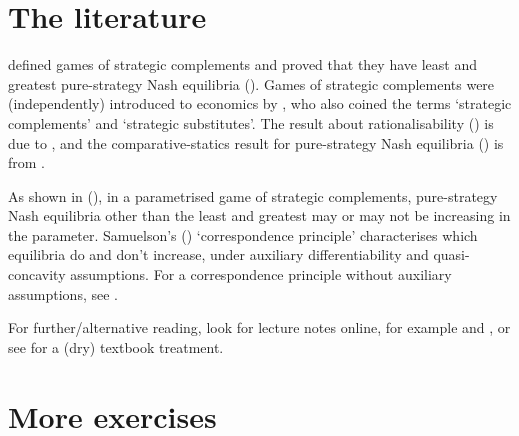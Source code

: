 \section{The literature}
\label{spm:lit}

\textcite{Topkis1979} defined games of strategic complements and proved that they have least and greatest pure-strategy Nash equilibria (). Games of strategic complements were (independently) introduced to economics by \textcite{BulowGeanakoplosKlemperer1985}, who also coined the terms `strategic complements' and `strategic substitutes'. The result about rationalisability () is due to \textcite{MilgromRoberts1990}, and the comparative-statics result for pure-strategy Nash equilibria () is from \textcite{MilgromRoberts1990,Vives1990,Sobel1988}.

As shown in  (), in a parametrised game of strategic complements, pure-strategy Nash equilibria other than the least and greatest may or may not be increasing in the parameter. Samuelson's (\citeyear{Samuelson1947}) `correspondence principle' characterises which equilibria do and don't increase, under auxiliary differentiability and quasi-concavity assumptions. For a correspondence principle without auxiliary assumptions, see \textcite{Echenique2002}.

For further/alternative reading, look for lecture notes online, for example \textcite[section~3]{Sarver2023} and \textcite{Levin2006spm}, or see \textcite[chapter~4]{Topkis1998} for a (dry) textbook treatment.



\section{More exercises}
\label{spm:exer}

